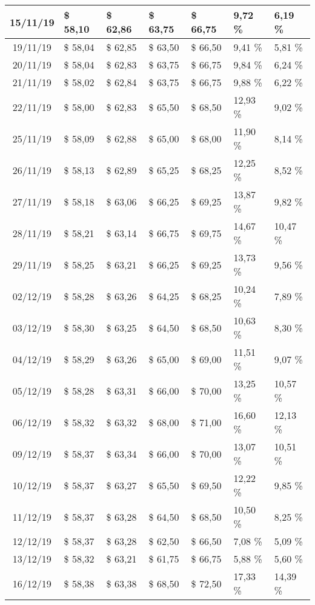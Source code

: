 \begin{center}
\begin{longtable}{|c|p{1.5cm}|p{1.5cm}|p{1.5cm}|p{1.5cm}|p{1.5cm}|p{1.5cm}|}
15/11/19 & \$ 58,10 & \$ 62,86 & \$ 63,75 & \$ 66,75 & 9,72 \% & 6,19 \% \\ \hline
19/11/19 & \$ 58,04 & \$ 62,85 & \$ 63,50 & \$ 66,50 & 9,41 \% & 5,81 \% \\ \hline
20/11/19 & \$ 58,04 & \$ 62,83 & \$ 63,75 & \$ 66,75 & 9,84 \% & 6,24 \% \\ \hline
21/11/19 & \$ 58,02 & \$ 62,84 & \$ 63,75 & \$ 66,75 & 9,88 \% & 6,22 \% \\ \hline
22/11/19 & \$ 58,00 & \$ 62,83 & \$ 65,50 & \$ 68,50 & 12,93 \% & 9,02 \% \\ \hline
25/11/19 & \$ 58,09 & \$ 62,88 & \$ 65,00 & \$ 68,00 & 11,90 \% & 8,14 \% \\ \hline
26/11/19 & \$ 58,13 & \$ 62,89 & \$ 65,25 & \$ 68,25 & 12,25 \% & 8,52 \% \\ \hline
27/11/19 & \$ 58,18 & \$ 63,06 & \$ 66,25 & \$ 69,25 & 13,87 \% & 9,82 \% \\ \hline
28/11/19 & \$ 58,21 & \$ 63,14 & \$ 66,75 & \$ 69,75 & 14,67 \% & 10,47 \% \\ \hline
29/11/19 & \$ 58,25 & \$ 63,21 & \$ 66,25 & \$ 69,25 & 13,73 \% & 9,56 \% \\ \hline
02/12/19 & \$ 58,28 & \$ 63,26 & \$ 64,25 & \$ 68,25 & 10,24 \% & 7,89 \% \\ \hline
03/12/19 & \$ 58,30 & \$ 63,25 & \$ 64,50 & \$ 68,50 & 10,63 \% & 8,30 \% \\ \hline
04/12/19 & \$ 58,29 & \$ 63,26 & \$ 65,00 & \$ 69,00 & 11,51 \% & 9,07 \% \\ \hline
05/12/19 & \$ 58,28 & \$ 63,31 & \$ 66,00 & \$ 70,00 & 13,25 \% & 10,57 \% \\ \hline
06/12/19 & \$ 58,32 & \$ 63,32 & \$ 68,00 & \$ 71,00 & 16,60 \% & 12,13 \% \\ \hline
09/12/19 & \$ 58,37 & \$ 63,34 & \$ 66,00 & \$ 70,00 & 13,07 \% & 10,51 \% \\ \hline
10/12/19 & \$ 58,37 & \$ 63,27 & \$ 65,50 & \$ 69,50 & 12,22 \% & 9,85 \% \\ \hline
11/12/19 & \$ 58,37 & \$ 63,28 & \$ 64,50 & \$ 68,50 & 10,50 \% & 8,25 \% \\ \hline
12/12/19 & \$ 58,37 & \$ 63,28 & \$ 62,50 & \$ 66,50 & 7,08 \% & 5,09 \% \\ \hline
13/12/19 & \$ 58,32 & \$ 63,21 & \$ 61,75 & \$ 66,75 & 5,88 \% & 5,60 \% \\ \hline
16/12/19 & \$ 58,38 & \$ 63,38 & \$ 68,50 & \$ 72,50 & 17,33 \% & 14,39 \% \\ \hline

\end{longtable}
\end{center}
